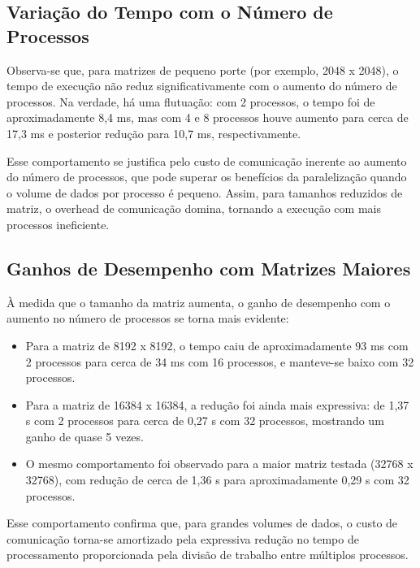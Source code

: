 \documentclass[a4paper, 12pt]{article}
\begin{document}
	\subsection{Variação do Tempo com o Número de Processos}
	
	\hspace{0.62cm}Observa-se que, para matrizes de pequeno porte (por exemplo, 2048 x 2048), o tempo de execução não reduz significativamente com o aumento do número de processos. Na verdade, há uma flutuação: com 2 processos, o tempo foi de aproximadamente 8,4 ms, mas com 4 e 8 processos houve aumento para cerca de 17,3 ms e posterior redução para 10,7 ms, respectivamente.
	
	Esse comportamento se justifica pelo custo de comunicação inerente ao aumento do número de processos, que pode superar os benefícios da paralelização quando o volume de dados por processo é pequeno. Assim, para tamanhos reduzidos de matriz, o overhead de comunicação domina, tornando a execução com mais processos ineficiente.
	
	\subsection{Ganhos de Desempenho com Matrizes Maiores}
	\hspace{0.62cm}À medida que o tamanho da matriz aumenta, o ganho de desempenho com o aumento no número de processos se torna mais evidente:
	
	\begin{itemize}
		\item Para a matriz de 8192 x 8192, o tempo caiu de aproximadamente 93 ms com 2 processos para cerca de 34 ms com 16 processos, e manteve-se baixo com 32 processos.
		
		\item Para a matriz de 16384 x 16384, a redução foi ainda mais expressiva: de 1,37 s com 2 processos para cerca de 0,27 s com 32 processos, mostrando um ganho de quase 5 vezes.
		
		\item O mesmo comportamento foi observado para a maior matriz testada (32768 x 32768), com redução de cerca de 1,36 s para aproximadamente 0,29 s com 32 processos.
	\end{itemize}
	
	Esse comportamento confirma que, para grandes volumes de dados, o custo de comunicação torna-se amortizado pela expressiva redução no tempo de processamento proporcionada pela divisão de trabalho entre múltiplos processos.
	
\end{document}
